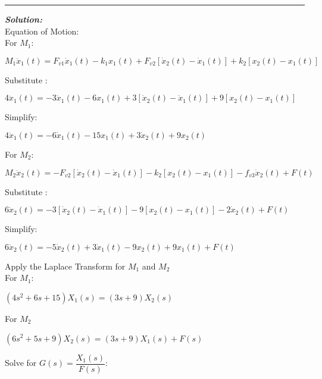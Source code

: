 \documentclass[11pt,letterpaper]{article}
\begin{document}
	\rule{\textwidth}{1pt}
\vspace{12pt}
\textit{\textbf{Solution:}}\\
Equation of Motion:\\[12pt]
For $M_1$:\\
\begin{center}
	$M_1\ddot{x}_1(t)=F_{v1}\dot{x}_1(t)-k_1x_1(t)+F_{v2}[\dot{x}_2(t)-\dot{x}_1(t)]+k_2[x_2(t)-x_1(t)]$\\[12pt]
\end{center}
Substitute :\\
\begin{center}
	$4\ddot{x}_1(t)=-3\dot{x}_1(t)-6x_1(t)+3[\dot{x}_2(t)-\dot{x}_1(t)]+9[x_2(t)-x_1(t)]$\\[12pt]
\end{center}
Simplify:\\
\begin{center}
	$4\ddot{x}_1(t)=-6\dot{x}_1(t)-15x_1(t)+3\dot{x}_2(t)+9x_2(t)$\\[12pt]
\end{center}
For $M_2$:\\
\begin{center}
	$M_2\ddot{x}_2(t)=-F_{v2}[\dot{x}_2(t)-\dot{x}_1(t)]-k_2[x_2(t)-x_1(t)]-f_{v3}\dot{x}_2(t)+F(t)$\\[12pt]
\end{center}
Substitute :\\
\begin{center}
	$6\ddot{x}_2(t)=-3[\dot{x}_2(t)-\dot{x}_1(t)]-9[x_2(t)-x_1(t)]-2\dot{x}_2(t)+F(t)$\\[12pt]
\end{center}
Simplify:\\
\begin{center}
	$6\ddot{x}_2(t)=-5\dot{x}_2(t)+3\dot{x}_1(t)-9x_2(t)+9x_1(t)+F(t)$\\[12pt]
\end{center}
Apply the Laplace Transform for $M_1$ and $M_2$\\[12pt]
For $M_1$:\\[12pt]
\begin{center}
	$(4s^2+6s+15)X_1(s)=(3s+9)X_2(s)$\\
\end{center}
For $M_2$\\
\begin{center}
	$(6s^2+5s+9)X_2(s)=(3s+9)X_1(s)+F(s)$\\[12pt]
\end{center}
Solve for $G(s)=\dfrac{X_1(s)}{F(s)}$:\\
\end{document}
